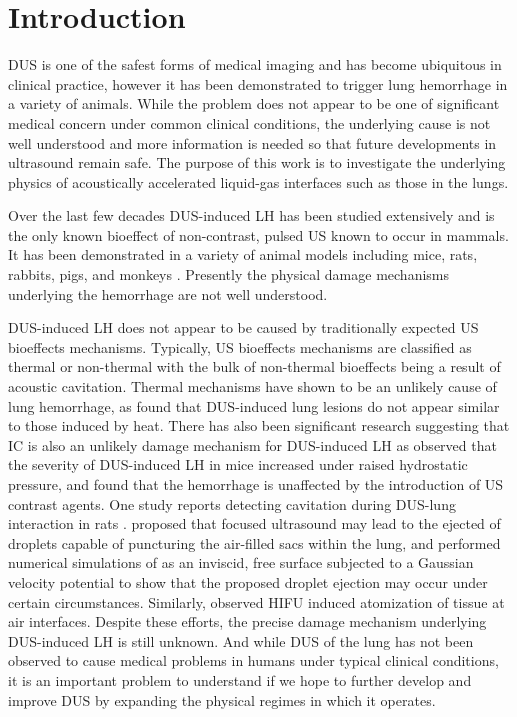 \section{Introduction}%
\label{sec:introduction}%
%
\ac{DUS} is one of the safest forms of medical imaging and has become
ubiquitous in clinical practice, however it has been demonstrated to
trigger lung hemorrhage in a variety of animals. While the problem
does not appear to be one of significant medical concern under common
clinical conditions, the underlying cause is not well understood and
more information is needed so that future developments in ultrasound
remain safe. The purpose of this work is to investigate the underlying
physics of acoustically accelerated liquid-gas interfaces such as
those in the lungs. 

Over the last few decades \ac{DUS}-induced \ac{LH} has been
studied extensively and is the only known bioeffect of non-contrast,
pulsed \ac{US} known to occur in mammals. It has been demonstrated in
a variety of animal models including mice, rats, rabbits, pigs, and
monkeys \citep{Child1990,OBrien2006a,Tarantal1994a}. Presently the
physical damage mechanisms underlying the hemorrhage are not well
understood.

\ac{DUS}-induced \ac{LH} does not appear to be caused by traditionally
expected \ac{US} bioeffects mechanisms. Typically, \ac{US} bioeffects
mechanisms are classified as thermal or non-thermal with the bulk of
non-thermal bioeffects being a result of acoustic cavitation. Thermal
mechanisms have shown to be an unlikely cause of lung hemorrhage, as
\cite{Zachary2006} found that \ac{DUS}-induced lung lesions do not
appear similar to those induced by heat. There has also been
significant research suggesting that \ac{IC} is also an unlikely
damage mechanism for \ac{DUS}-induced \ac{LH} as \cite{OBrien2000}
observed that the severity of \ac{DUS}-induced \ac{LH} in mice
increased under raised hydrostatic pressure, and \cite{Raeman1996}
found that the hemorrhage is unaffected by the introduction of \ac{US}
contrast agents. One study reports detecting cavitation during
\ac{DUS}-lung interaction in rats \cite{Holland1996}. \cite{Tjan2007}
proposed that focused ultrasound may lead to the ejected of droplets
capable of puncturing the air-filled sacs within the lung, and
performed numerical simulations of as an inviscid, free surface
subjected to a Gaussian velocity potential to show that the proposed
droplet ejection may occur under certain circumstances. Similarly,
\cite{Simon2012} observed \ac{HIFU} induced atomization of tissue at
air interfaces. Despite these efforts, the precise damage mechanism
underlying \ac{DUS}-induced \ac{LH} is still unknown. And while
\ac{DUS} of the lung has not been observed to cause medical problems
in humans under typical clinical conditions, it is an important
problem to understand if we hope to further develop and improve
\ac{DUS} by expanding the physical regimes in which it operates.

